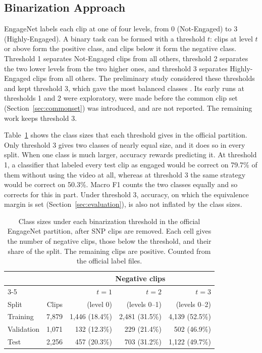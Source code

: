 \subsection{Binarization Approach}
\label{sec:binarization}

EngageNet labels each clip at one of four levels, from 0 (Not-Engaged) to 3 (Highly-Engaged). A binary task can be formed with a threshold $t$: clips at level $t$ or above form the positive class, and clips below it form the negative class. Threshold 1 separates Not-Engaged clips from all others, threshold 2 separates the two lower levels from the two higher ones, and threshold 3 separates Highly-Engaged clips from all others. The preliminary study considered these thresholds and kept threshold 3, which gave the most balanced classes \cite{sityar2026icce}. Its early runs at thresholds 1 and 2 were exploratory, were made before the common clip set (Section~\ref{sec:commonset}) was introduced, and are not reported. The remaining work keeps threshold 3.

Table~\ref{tab:thresholds} shows the class sizes that each threshold gives in the official partition. Only threshold 3 gives two classes of nearly equal size, and it does so in every split. When one class is much larger, accuracy rewards predicting it. At threshold 1, a classifier that labeled every test clip as engaged would be correct on 79.7\% of them without using the video at all, whereas at threshold 3 the same strategy would be correct on 50.3\%. Macro F1 counts the two classes equally and so corrects for this in part. Under threshold 3, accuracy, on which the equivalence margin is set (Section~\ref{sec:evaluation}), is also not inflated by the class sizes.

\begin{table}[t]
   \centering
   \caption[Class sizes under each binarization threshold]{Class sizes under each binarization threshold in the official EngageNet partition, after SNP clips are removed. Each cell gives the number of negative clips, those below the threshold, and their share of the split. The remaining clips are positive. Counted from the official label files.}
   \label{tab:thresholds}
   \begin{tabular}{lrrrr}
      \toprule
      & & \multicolumn{3}{c}{Negative clips} \\
      \cmidrule(lr){3-5}
      & & $t = 1$ & $t = 2$ & $t = 3$ \\
      Split & Clips & (level 0) & (levels 0--1) & (levels 0--2) \\
      \midrule
      Training & 7,879 & 1,446 (18.4\%) & 2,481 (31.5\%) & 4,139 (52.5\%) \\
      Validation & 1,071 & 132 (12.3\%) & 229 (21.4\%) & 502 (46.9\%) \\
      Test & 2,256 & 457 (20.3\%) & 703 (31.2\%) & 1,122 (49.7\%) \\
      \bottomrule
   \end{tabular}
\end{table}

